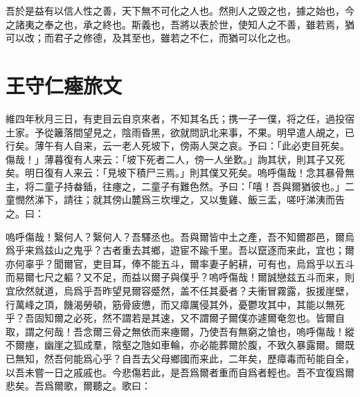 吾於是益有以信人性之善，天下無不可化之人也。然則人之毁之也，據之始也，今之諸夷之奉之也，承之終也。斯義也，吾將以表於世，使知人之不善，雖若焉，猶可以改；而君子之修德，及其至也，雖若之不仁，而猶可以化之也。%

\theendnotes

\section[瘞旅文\quad{\small 王守仁}]{{\normalsize 王守仁}\quad 瘞旅文}
維四年秋月三日，有吏目云自京來者，不知其名氏；携一子一僕，将之任，過投宿土家。予從籬落間望見之，陰雨昏黑，欲就問訊北来事，不果。明早遣人覘之，已行矣。薄午有人自来，云一老人死坡下，傍兩人哭之哀。予曰：「此必吏目死矣。傷哉！」薄暮復有人来云：「坡下死者二人，傍一人坐{歎}。」詢其状，則其子又死矣。明日復有人来云：「見坡下積尸三焉。」則其僕又死矣。嗚呼傷哉！念其暴骨無主，将二童子持畚鍤，往瘞之，二童子有難色然。予曰：「嘻！吾與爾猶彼也。」二童憫然涕下，請往；就其傍山麓爲三坎埋之，又以隻雞、飯三盂，嗟吁涕洟而告之。曰：%

嗚呼傷哉！繄何人？繄何人？吾驛丞也。吾與爾皆中土之產，吾不知爾郡邑，爾烏爲乎来爲兹山之鬼乎？古者重去其鄉，遊宦不踰千里。吾以竄逐而来此，宜也；爾亦何辜乎？聞爾官，吏目耳，俸不能五斗，爾率妻子躬耕，可有也，{烏}爲乎以五斗而易爾七尺之軀？又不足，而益以爾子與僕乎？嗚呼傷哉！爾誠戀兹五斗而来，則宜欣然就道，{烏}爲乎吾昨望見爾容蹙然，盖不{任}其憂者？夫衝冒{霧}露，扳援崖壁，行萬峰之頂，饑渴勞頓，筋骨疲憊，而又瘴厲侵其外，憂鬱攻其中，其能以無死乎？吾固知爾之必死，然不謂若是其速，又不謂爾子爾僕亦遽爾奄忽也。皆爾自取，謂之何哉！吾念爾三骨之無依而来瘞{爾}，乃使吾有無窮之愴也，嗚呼傷哉！縱不爾瘞，幽崖之狐成羣，陰壑之虺如車輪，亦必能葬爾於腹，不致久暴{露}爾。爾既已無知，然吾何能爲心乎？自吾去父母鄉國而来此，二年矣，歷瘴毒而茍能自全，以吾未嘗一日之戚戚也。今悲傷若此，是吾爲爾者重而自爲者輕也。吾不宜復爲爾悲矣。吾爲爾歌，爾聽之。歌曰：%

